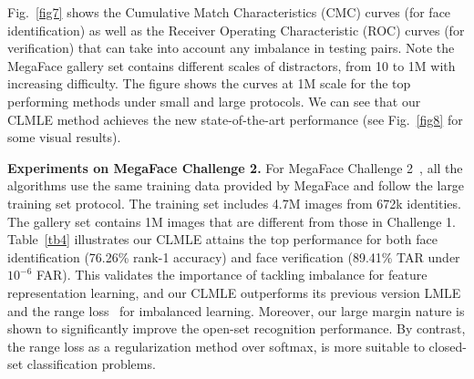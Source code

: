 \documentclass[10pt,journal,compsoc]{IEEEtran}
\begin{document}
\begin{table}[!t]
\caption{Face recognition on MegaFace Challenge 2~\cite{Nech_2017_CVPR} under the large training set protocol. ``Rank 1'' refers to rank-1 face identification accuracy (\%) with 1M distractors, and ``Veri.'' refers to face verification TAR (\%) under $10^{-6}$ FAR. The SphereFace~\cite{liu2017sphereface}, CosFace~\cite{2018Wang} and imbalanced learning methods in the last cell use the same 64-layer CNN model for fair comparison.}
\centering
{}
\label{tb4}
\end{table}

Fig.~\ref{fig7} shows the Cumulative Match Characteristics (CMC) curves (for face identification) as well as the Receiver Operating Characteristic (ROC) curves (for verification) that can take into account any imbalance in testing pairs. Note the MegaFace gallery set contains different scales of distractors, from 10 to 1M with increasing difficulty. The figure shows the curves at 1M scale for the top performing methods under small and large protocols. We can see that our CLMLE method achieves the new state-of-the-art performance (see Fig.~\ref{fig8} for some visual results).


\noindent
{\bf Experiments on MegaFace Challenge 2.} For MegaFace Challenge 2~\cite{Nech_2017_CVPR}, all the algorithms use the same training data provided by MegaFace and follow the large training set protocol. The training set includes 4.7M images from 672k identities. The gallery set contains 1M images that are different from those in Challenge 1. Table~\ref{tb4} illustrates our CLMLE attains the top performance for both face identification (76.26\% rank-1 accuracy) and face verification (89.41\% TAR under $10^{-6}$ FAR). This validates the importance of tackling imbalance for feature representation learning, and our CLMLE outperforms its previous version LMLE and the range loss~\cite{Zhang_8237840} for imbalanced learning. Moreover, our large margin nature is shown to significantly improve the open-set recognition performance. By contrast, the range loss as a regularization method over softmax, is more suitable to closed-set classification problems.
\end{document}
